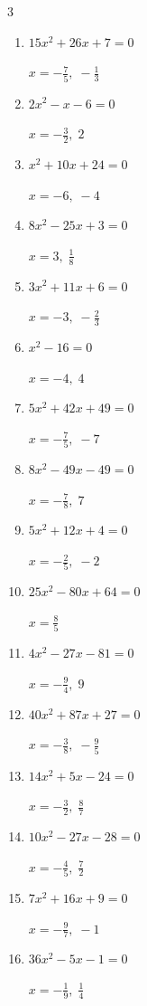 \begin{multicols}{3}
\begin{enumerate}
  \item $15x^{2}+26x+7=0$

        $\displaystyle x=-\frac{7}{5},\; -\frac{1}{3}$

  \item $2x^{2}-x-6=0$

        $\displaystyle x=-\frac{3}{2},\; 2$

  \item $x^{2}+10x+24=0$

        $\displaystyle x=-6,\; -4$

  \item $8x^{2}-25x+3=0$

        $\displaystyle x=3,\; \frac{1}{8}$

  \item $3x^{2}+11x+6=0$

        $\displaystyle x=-3,\; -\frac{2}{3}$

  \item $x^{2}-16=0$

        $\displaystyle x=-4,\; 4$

\columnbreak %

  \item $5x^{2}+42x+49=0$

        $\displaystyle x=-\frac{7}{5},\; -7$

  \item $8x^{2}-49x-49=0$

        $\displaystyle x=-\frac{7}{8},\; 7$

  \item $5x^{2}+12x+4=0$

        $\displaystyle x=-\frac{2}{5},\; -2$

  \item $25x^{2}-80x+64=0$

        $\displaystyle x=\frac{8}{5}$

  \item $4x^{2}-27x-81=0$

        $\displaystyle x=-\frac{9}{4},\; 9$

  \item $40x^{2}+87x+27=0$

        $\displaystyle x=-\frac{3}{8},\; -\frac{9}{5}$

  \item $14x^{2}+5x-24=0$

        $\displaystyle x=-\frac{3}{2},\; \frac{8}{7}$

  \item $10x^{2}-27x-28=0$

        $\displaystyle x=-\frac{4}{5},\; \frac{7}{2}$

  \item $7x^{2}+16x+9=0$

        $\displaystyle x=-\frac{9}{7},\; -1$

  \item $36x^{2}-5x-1=0$

        $\displaystyle x=-\frac{1}{9},\; \frac{1}{4}$

\end{enumerate}
\end{multicols}
